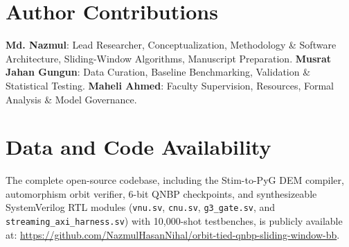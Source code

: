\documentclass[journal]{IEEEtran}
\begin{document}
\section*{Author Contributions}
\textbf{Md. Nazmul}: Lead Researcher, Conceptualization, Methodology \& Software Architecture, Sliding-Window Algorithms, Manuscript Preparation. \textbf{Musrat Jahan Gungun}: Data Curation, Baseline Benchmarking, Validation \& Statistical Testing. \textbf{Maheli Ahmed}: Faculty Supervision, Resources, Formal Analysis \& Model Governance.

\section*{Data and Code Availability}
The complete open-source codebase, including the Stim-to-PyG DEM compiler, automorphism orbit verifier, 6-bit QNBP checkpoints, and synthesizeable SystemVerilog RTL modules (\texttt{vnu.sv}, \texttt{cnu.sv}, \texttt{g3\_gate.sv}, and \texttt{streaming\_axi\_harness.sv}) with 10,000-shot testbenches, is publicly available at: \url{https://github.com/NazmulHasanNihal/orbit-tied-qnbp-sliding-window-bb}.

\balance


\end{document}
